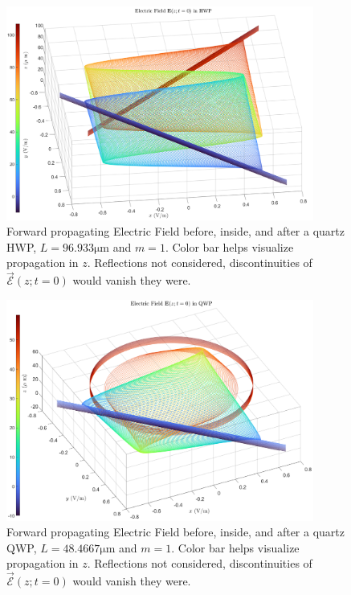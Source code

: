 \documentclass{optica-article}
\begin{document}
\begin{figure}[htbp]
  \centering
  \includegraphics[width=0.9\textwidth]{figs/EfieldInHWP4.png}
  \caption{
      Forward propagating Electric Field before, inside, and after
      a quartz HWP, $L = 96.933\si{\micro \meter}$ and 
      $m=1$. Color bar helps visualize propagation in $z$.
      Reflections not considered, discontinuities of 
      $\vec{\mathscr{E}}(z; t= 0)$ would vanish they were.
  }
  \label{fig:Q_HWP}
\end{figure}

\begin{figure}[htbp]
  \centering
  \includegraphics[width=0.9\textwidth]{figs/EfieldInQWP3.png}
  \caption{
      Forward propagating Electric Field before, inside, and after
      a quartz QWP, $L = 48.4667\si{\micro \meter}$ and 
      $m=1$. Color bar helps visualize propagation in $z$.
      Reflections not considered, discontinuities of 
      $\vec{\mathscr{E}}(z; t= 0)$ would vanish they were.
  }
  \label{fig:Q_QWP}
\end{figure}
\end{document}
